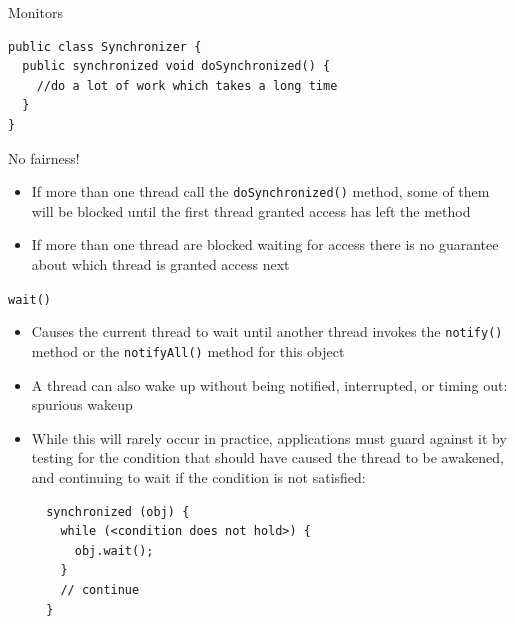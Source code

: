 \begin{frame}[fragile]{Monitors}
\begin{lstlisting}
public class Synchronizer {
  public synchronized void doSynchronized() {
    //do a lot of work which takes a long time
  }
}
\end{lstlisting}


  \begin{alertblock}{No fairness!}
    \begin{itemize}
    \item If more than one thread call the
      \lstinline!doSynchronized()!  method, some of them will be
      blocked until the first thread granted access has left the
      method
    \item If more than one thread are blocked waiting for access there
      is no guarantee about which thread is granted access next
    \end{itemize}
  \end{alertblock}
\end{frame}

\begin{frame}[fragile]{\lstinline!wait()!}
  \begin{itemize}
  \item Causes the current thread to wait until another thread invokes
    the \lstinline!notify()! method or the \lstinline!notifyAll()!
    method for this object
  \item A thread can also wake up without being notified, interrupted,
    or timing out: \alert{spurious wakeup}
  \item While this will rarely occur in practice, applications must
    guard against it by testing for the condition that should have
    caused the thread to be awakened, and continuing to wait if the
    condition is not satisfied:
\begin{lstlisting}
  synchronized (obj) {
    while (<condition does not hold>) {
      obj.wait();
    }
    // continue
  }
\end{lstlisting} 
  \end{itemize}
\end{frame}


